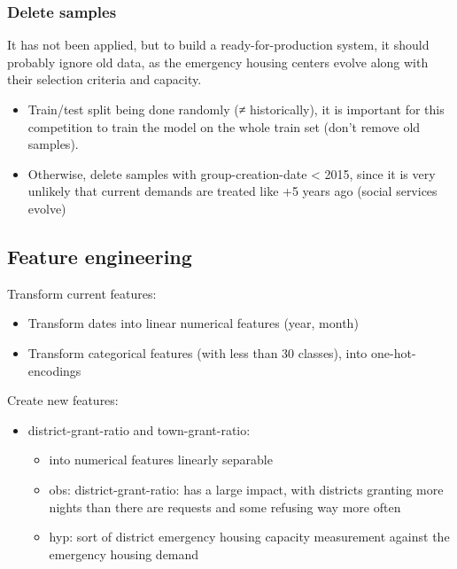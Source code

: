\documentclass[11pt]{article}
\theoremstyle{definition}
\begin{document}
        \subsubsection{Delete samples}
            It has not been applied, but to build a ready-for-production system, it should probably ignore old data, as the emergency housing centers evolve along with their selection criteria and capacity.
            \begin{itemize}
                \item Train/test split being done randomly (≠ historically), it is important for this competition to train the model on the whole train set (don't remove old samples).
                \item Otherwise, delete samples with group-creation-date < 2015, since it is very unlikely that current demands are treated like +5 years ago (social services evolve)
            \end{itemize}


    \subsection{Feature engineering}

        Transform current features:
        \begin{itemize}
            \item Transform dates into linear numerical features (year, month)
            \item Transform categorical features (with less than 30 classes), into one-hot-encodings
        \end{itemize}

        Create new features:
        \begin{itemize}
            \item district-grant-ratio and town-grant-ratio:
            \begin{itemize}
                \item into numerical features linearly separable
                \item obs: district-grant-ratio: has a large impact, with districts granting more nights than there are requests and some refusing way more often
                \item hyp: sort of district emergency housing capacity measurement against the emergency housing demand
            \end{itemize} 
        \end{itemize}
        
\end{document}
